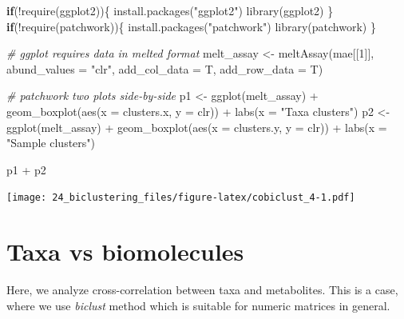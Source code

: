 \documentclass[
]{book}
\newenvironment{Shaded}{\begin{snugshade}}{\end{snugshade}}
\newcommand{\AttributeTok}[1]{\textcolor[rgb]{0.77,0.63,0.00}{#1}}
\newcommand{\CommentTok}[1]{\textcolor[rgb]{0.56,0.35,0.01}{\textit{#1}}}
\newcommand{\ControlFlowTok}[1]{\textcolor[rgb]{0.13,0.29,0.53}{\textbf{#1}}}
\newcommand{\DecValTok}[1]{\textcolor[rgb]{0.00,0.00,0.81}{#1}}
\newcommand{\FunctionTok}[1]{\textcolor[rgb]{0.00,0.00,0.00}{#1}}
\newcommand{\NormalTok}[1]{#1}
\newcommand{\OtherTok}[1]{\textcolor[rgb]{0.56,0.35,0.01}{#1}}
\newcommand{\SpecialCharTok}[1]{\textcolor[rgb]{0.00,0.00,0.00}{#1}}
\newcommand{\StringTok}[1]{\textcolor[rgb]{0.31,0.60,0.02}{#1}}
\begin{document}
\begin{Shaded}
\begin{Highlighting}[]
\ControlFlowTok{if}\NormalTok{(}\SpecialCharTok{!}\FunctionTok{require}\NormalTok{(ggplot2))\{}
    \FunctionTok{install.packages}\NormalTok{(}\StringTok{"ggplot2"}\NormalTok{)}
    \FunctionTok{library}\NormalTok{(ggplot2)}
\NormalTok{\}}
\ControlFlowTok{if}\NormalTok{(}\SpecialCharTok{!}\FunctionTok{require}\NormalTok{(patchwork))\{}
    \FunctionTok{install.packages}\NormalTok{(}\StringTok{"patchwork"}\NormalTok{)}
    \FunctionTok{library}\NormalTok{(patchwork)}
\NormalTok{\}}

\CommentTok{\# ggplot requires data in melted format}
\NormalTok{melt\_assay }\OtherTok{\textless{}{-}} \FunctionTok{meltAssay}\NormalTok{(mae[[}\DecValTok{1}\NormalTok{]], }\AttributeTok{abund\_values =} \StringTok{"clr"}\NormalTok{, }\AttributeTok{add\_col\_data =}\NormalTok{ T, }\AttributeTok{add\_row\_data =}\NormalTok{ T)}

\CommentTok{\# patchwork two plots side{-}by{-}side}
\NormalTok{p1 }\OtherTok{\textless{}{-}} \FunctionTok{ggplot}\NormalTok{(melt\_assay) }\SpecialCharTok{+}
  \FunctionTok{geom\_boxplot}\NormalTok{(}\FunctionTok{aes}\NormalTok{(}\AttributeTok{x =}\NormalTok{ clusters.x, }\AttributeTok{y =}\NormalTok{ clr)) }\SpecialCharTok{+}
  \FunctionTok{labs}\NormalTok{(}\AttributeTok{x =} \StringTok{"Taxa clusters"}\NormalTok{)}
\NormalTok{p2 }\OtherTok{\textless{}{-}} \FunctionTok{ggplot}\NormalTok{(melt\_assay) }\SpecialCharTok{+}
  \FunctionTok{geom\_boxplot}\NormalTok{(}\FunctionTok{aes}\NormalTok{(}\AttributeTok{x =}\NormalTok{ clusters.y, }\AttributeTok{y =}\NormalTok{ clr)) }\SpecialCharTok{+}
  \FunctionTok{labs}\NormalTok{(}\AttributeTok{x =} \StringTok{"Sample clusters"}\NormalTok{)}

\NormalTok{p1 }\SpecialCharTok{+}\NormalTok{ p2}
\end{Highlighting}
\end{Shaded}

\texttt{[image: 24\_biclustering\_files/figure-latex/cobiclust\_4-1.pdf]}

\hypertarget{taxa-vs-biomolecules}{%
\section{Taxa vs biomolecules}\label{taxa-vs-biomolecules}}

Here, we analyze cross-correlation between taxa and metabolites. This is a case, where
we use \emph{biclust} method which is suitable for numeric matrices in general.
\end{document}
